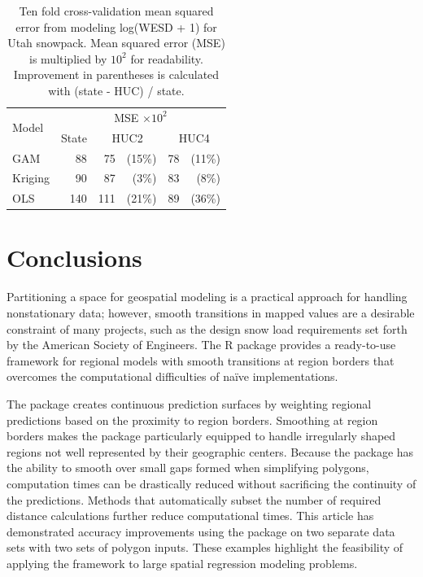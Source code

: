 \begin{table}[htbp]
    \centering
    \begin{tabular}{lrr@{}rr@{}r}
        \toprule
        \multirow{2}{*}{Model} & \multicolumn{5}{c}{MSE $\times10^2$}\\
        \cline{2-6}
        & State & \multicolumn{2}{c}{HUC2} & \multicolumn{2}{c}{HUC4}\\
        \midrule
        GAM & 88 & 75 & (15\%) & 78 & (11\%) \\
        Kriging & 90 & 87 & (3\%) & 83 & (8\%) \\
        OLS & 140 & 111 & (21\%) & 89 & (36\%)\\
        \bottomrule
    \end{tabular}
    \caption{Ten fold cross-validation mean squared error from modeling log(WESD + 1) for Utah snowpack. Mean squared error (MSE) is multiplied by $10^2$ for readability. Improvement in parentheses is calculated with (state - HUC) / state.}
    \label{tab:standard_cv_apr1}
\end{table}



\section{Conclusions}

Partitioning a space for geospatial modeling is a practical approach for handling nonstationary data; however, smooth transitions in mapped values are a desirable constraint of many projects, such as the design snow load requirements set forth by the American Society of Engineers. The  R package provides a ready-to-use framework for regional models with smooth transitions at region borders that overcomes the computational difficulties of na\"ive implementations.

The  package creates continuous prediction surfaces by weighting regional predictions based on the proximity to region borders. Smoothing at region borders makes the package particularly equipped to handle irregularly shaped regions not well represented by their geographic centers. Because the  package has the ability to smooth over small gaps formed when simplifying polygons, computation times can be drastically reduced without sacrificing the continuity of the predictions. Methods that automatically subset the number of required distance calculations further reduce computational times. This article has demonstrated accuracy improvements using the  package on two separate data sets with two sets of polygon inputs. These examples highlight the feasibility of applying the  framework to large spatial regression modeling problems.\\ 


